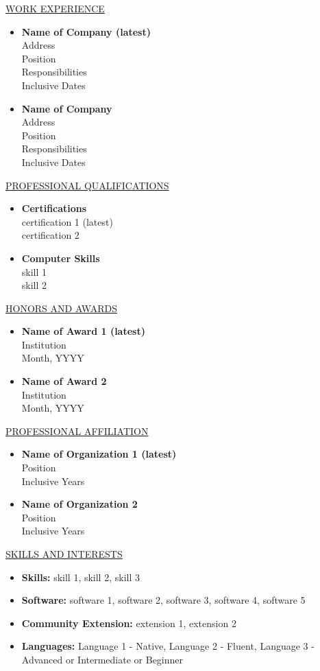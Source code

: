 {\singlespace
\noindent \underline{WORK EXPERIENCE} %
\begin{itemize}
\item[] \textbf{Name of Company (latest)}\\
Address\\
Position\\
Responsibilities\\
Inclusive Dates
\item[] \textbf{Name of Company}\\
Address\\
Position\\
Responsibilities\\
Inclusive Dates
\end{itemize}
}

{\singlespace
\noindent \underline{PROFESSIONAL QUALIFICATIONS}
\begin{itemize}
\item[] \textbf{Certifications}\\
certification 1 (latest)\\
certification 2
\item[] \textbf{Computer Skills}\\
skill 1 \\
skill 2
\end{itemize}
}


{\singlespace
\noindent \underline{HONORS AND AWARDS}
\begin{itemize}
\item[] \textbf{Name of Award 1 (latest)}\\
Institution\\
Month, YYYY
\item[] \textbf{Name of Award 2}\\
Institution\\
Month, YYYY
\end{itemize}
}

{\singlespace
\noindent \underline{PROFESSIONAL AFFILIATION}
\begin{itemize}
\item[] \textbf{Name of Organization 1 (latest)}\\
Position\\
Inclusive Years
\item[] \textbf{Name of Organization 2}\\
Position\\
Inclusive Years
\end{itemize}
}

{\singlespace
\noindent \underline{SKILLS AND INTERESTS}
\begin{itemize}
\item[] \textbf{Skills:} skill 1, skill 2, skill 3 
\item[] \textbf{Software:} software 1, software 2, software 3, software 4, software 5
\item[] \textbf{Community Extension:} extension 1, extension 2
\item[] \textbf{Languages:} Language 1 - Native, Language 2 - Fluent, Language 3 - Advanced or Intermediate or Beginner
\end{itemize}
}